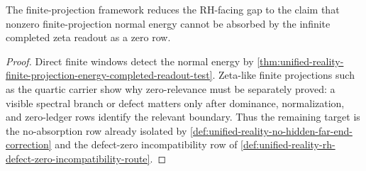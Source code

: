 \begin{corollary}
\label{cor:unified-reality-finite-projections-identify-no-absorption-target}
The finite-projection framework reduces the RH-facing gap to the claim
that nonzero finite-projection normal energy cannot be absorbed by the
infinite completed zeta readout as a zero row.
\end{corollary}

\begin{proof}
Direct finite windows detect the normal energy by
\autoref{thm:unified-reality-finite-projection-energy-completed-readout-test}.
Zeta-like finite projections such as the quartic carrier show why
zero-relevance must be separately proved: a visible spectral branch or
defect matters only after dominance, normalization, and zero-ledger rows
identify the relevant boundary.  Thus the remaining target is the
no-absorption row already isolated by
\autoref{def:unified-reality-no-hidden-far-end-correction} and the
defect-zero incompatibility row of
\autoref{def:unified-reality-rh-defect-zero-incompatibility-route}.
\end{proof}

